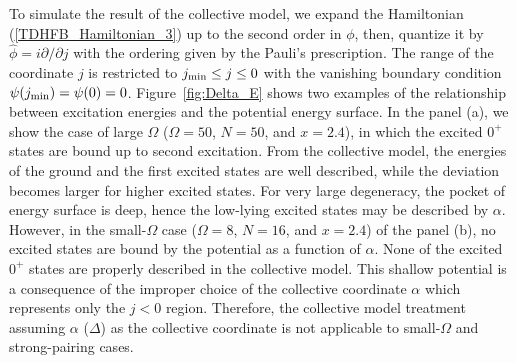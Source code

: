 \documentclass[%
superscriptaddress,
preprint,
showpacs,
nofootinbib,
amsmath,amssymb,
aps,
prc,
floatfix ]%
{revtex4-1}
\begin{document}
To simulate the result of the collective model, we expand the Hamiltonian
(\ref{TDHFB_Hamiltonian_3}) up to the second order in $\phi$,
then, quantize it by $\hat{\phi}=i\partial/\partial j$ with
the ordering given by the Pauli's prescription.
The range of the coordinate $j$ is restricted to $j_{\rm min}\leq j \leq 0$
with the vanishing boundary condition $\psi(j_{\rm min})=\psi(0)=0$.
Figure~\ref{fig:Delta_E} shows two examples of the relationship 
between excitation energies and the potential energy surface.
In the panel (a), we show the case of large $\Omega$
($\Omega=50$, $N=50$, and $x=2.4$),
in which
the excited $0^+$ states are bound up to second excitation.
From the collective model, the energies of the ground and the first excited states
are well described, while the deviation becomes larger for
higher excited states.
For very large degeneracy, the pocket of energy surface is deep, 
hence the low-lying excited states may be described by $\alpha$. 
However, in the small-$\Omega$ case ($\Omega=8$, $N=16$, and $x=2.4$)
of the panel (b), no excited states are bound by the potential
as a function of $\alpha$.
None of the excited $0^+$ states
are properly described in the collective model.
This shallow potential is a consequence of the improper
choice of the collective coordinate $\alpha$
which represents only the $j<0$ region.
Therefore, the collective model treatment assuming
$\alpha$ ($\Delta$) as the collective coordinate
is not applicable to small-$\Omega$ and strong-pairing cases.

\end{document}
